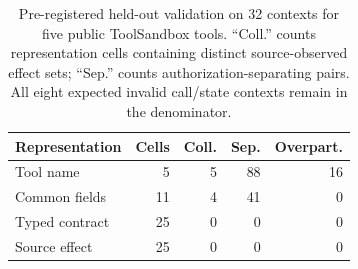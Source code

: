 \begin{table}[t]
\centering
\small
\setlength{\tabcolsep}{3.5pt}
\caption{Pre-registered held-out validation on 32 contexts for five public
ToolSandbox tools. ``Coll.'' counts representation cells containing distinct
source-observed effect sets; ``Sep.'' counts authorization-separating pairs.
All eight expected invalid call/state contexts remain in the denominator.}
\label{tab:toolsandbox-heldout}
\begin{tabular}{lrrrr}
\toprule
Representation & Cells & Coll. & Sep. & Overpart. \\
\midrule
Tool name & 5 & 5 & 88 & 16 \\
Common fields & 11 & 4 & 41 & 0 \\
Typed contract & 25 & 0 & 0 & 0 \\
Source effect & 25 & 0 & 0 & 0 \\
\bottomrule
\end{tabular}
\end{table}
